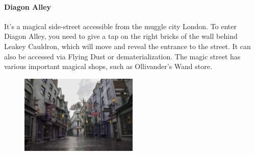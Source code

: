 \paragraph{Diagon Alley}
It's a magical side-street accessible from the muggle city London. To enter Diagon Alley, you need to give a tap on the right bricks of the wall behind Leakey Cauldron, which will move and reveal the entrance to the street. It can also be accessed via Flying Dust or dematerialization. The magic street has various important magical shops, such as Ollivander's Wand store.
\begin{figure}
\centering
\includegraphics[max width=0.5\textwidth]{../Pictures/Locations/DiagonAlley_picture.jpg} 
\end{figure} 

%
